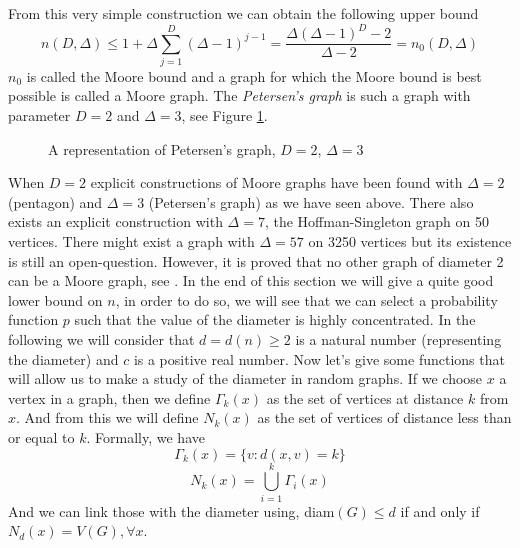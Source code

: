 From this very simple construction we can obtain the following upper bound
\begin{equation}
	n(D, \Delta) \leq 1 + \Delta \sum_{j=1}^{D}(\Delta - 1)^{j-1} = \frac{\Delta(\Delta - 1)^D - 2}{\Delta - 2} = n_0(D, \Delta)
\end{equation}
$n_0$ is called the Moore bound and a graph for which the Moore bound is best possible is called a Moore graph. 
The \emph{Petersen's graph} is such a graph with parameter $D= 2$ and $\Delta = 3$, see Figure \ref{fig:petG}.
\begin{figure}\label{fig:petG}
	\centering
    \caption{A representation of Petersen's graph, $D=2$, $\Delta =3$}
\end{figure}
When $D=2$ explicit constructions of Moore graphs have been found with $\Delta = 2$ (pentagon) and $\Delta = 3$ (Petersen's graph) as we have seen above.
There also exists an explicit construction with $\Delta = 7$, the Hoffman-Singleton graph on 50 vertices.
There might exist a graph with $\Delta = 57$ on 3250 vertices but its existence is still an open-question.
However, it is proved that no other graph of diameter 2 can be a Moore graph, see \cite{Hoffman60}.
\newline
In the end of this section we will give a quite good lower bound on $n$, in order to do so, we will see that we can select a probability function $p$ such that the value of the diameter is highly concentrated.
\newline
In the following we will consider that $d = d(n) \geq 2$ is a natural number (representing the diameter) and $c$ is a positive real number.
\newline
Now let's give some functions that will allow us to make a study of the diameter in random graphs. If we choose $x$ a vertex in a graph, then we define $\Gamma_k(x)$ as the set of vertices at distance $k$ from $x$. And from this we will define $N_k(x)$ as the set of vertices of distance less than or equal to $k$. 
Formally, we have
\begin{equation}
	\Gamma_k(x) = \{v : d(x, v) = k \}
\end{equation}
\begin{equation}
	N_k(x) = \bigcup_{i=1}^k \Gamma_i(x)
\end{equation}
And we can link those with the diameter using, diam$(G) \leq d $ if and only if $N_d(x) = V(G), \forall x$.
